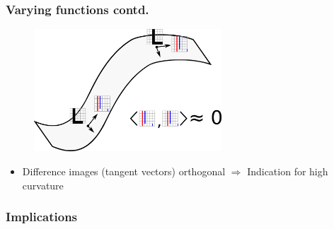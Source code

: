 \begin{frame}
	\frametitle{Varying functions contd.}
	\begin{figure}
		\centering
		\includegraphics[width=7cm]{images/tangentVectors.png}
	\end{figure}
	\begin{itemize}
		\item Difference images (tangent vectors) orthogonal $\Rightarrow$ Indication for high curvature
	\end{itemize}
\end{frame}

\begin{frame}
	\frametitle{Implications}
\end{frame}
